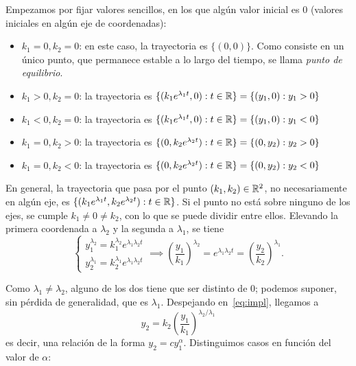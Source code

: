 \documentclass[../ecuaciones_diferenciales.tex]{subfiles}
\begin{document}
Empezamos por fijar valores sencillos, en los que algún valor inicial es 0
(valores iniciales en algún eje de coordenadas):
\begin{itemize}
	\item \(k_1 = 0, k_2 = 0\): en este caso, la trayectoria es \(\{(0,0)\}\). Como
	      consiste en un único punto, que permanece estable a lo largo del tiempo, se
	      llama \emph{punto de equilibrio}.

	\item \(k_1 > 0, k_2 = 0\): la trayectoria es \(\{(k_1e^{\lambda_1 t}, 0) : t \in
	      \mathbb{R}\} = \{(y_1, 0) : y_1 > 0\}\)

	\item \(k_1 < 0, k_2 = 0\): la trayectoria es \(\{(k_1e^{\lambda_1 t}, 0) : t \in
	      \mathbb{R}\} = \{(y_1, 0) : y_1 < 0\}\)

	\item \(k_1 = 0, k_2 > 0\): la trayectoria es \(\{(0, k_2e^{\lambda_2 t}) : t
	      \in \mathbb{R}\} = \{(0,y_2) : y_2 > 0\}\)

	\item \(k_1 = 0, k_2 < 0\): la trayectoria es \(\{(0, k_2e^{\lambda_2 t}) : t
	      \in \mathbb{R}\} = \{(0,y_2) : y_2 < 0\}\)
\end{itemize}

En general, la trayectoria que pasa por el punto \((k_1, k_2) \in \mathbb{R}^2\),
no necesariamente en algún eje, es
\(\{(k_1e^{\lambda_1 t}, k_2e^{\lambda_2 t}) : t \in \mathbb{R}\}\). Si el punto no está
sobre ninguno de los ejes, se cumple \(k_1 \neq 0 \neq k_2\), con lo que se
puede dividir entre ellos. Elevando la primera coordenada a \(\lambda_2\) y la
segunda a \(\lambda_1\), se tiene
\begin{equation}\label{eq:impl}
	\begin{cases}
		y_1^{\lambda_2} = k_1^{\lambda_2}e^{\lambda_1\lambda_2 t} \\
		y_2^{\lambda_1} = k_2^{\lambda_1}e^{\lambda_1\lambda_2 t}
	\end{cases} \implies {\left(\frac{y_1}{k_1}\right)}^{\lambda_2} = e^{\lambda_1
			\lambda_2 t} = {\left(\frac{y_2}{k_2}\right)}^{\lambda_1}.
\end{equation}

Como \(\lambda_1 \neq \lambda_2\), alguno de los dos tiene que ser distinto de
0; podemos suponer, sin pérdida de generalidad, que es \(\lambda_1\). Despejando
en~\eqref{eq:impl}, llegamos a
\[y_2 = k_2 {\left(\frac{y_1}{k_1}\right)}^{\lambda_2 / \lambda_1}\]
es decir, una relación de la forma \(y_2 = c y_1^\alpha\). Distinguimos casos en
función del valor de \(\alpha\):
\end{document}
